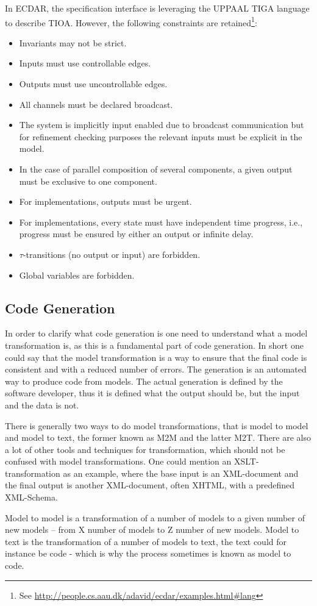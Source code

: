 In ECDAR, the specification interface is leveraging the UPPAAL TIGA language
\cite{behrmann_uppaal-tiga:_2006} to describe TIOA. However, the following
constraints are retained\footnote{See
  \url{http://people.cs.aau.dk/adavid/ecdar/examples.html\#lang}}:
%
\begin{itemize}
\item Invariants may not be strict.
\item Inputs must use controllable edges.
\item Outputs must use uncontrollable edges.
\item All channels must be declared broadcast.
\item The system is implicitly input enabled due to broadcast communication but
  for refinement checking purposes the relevant inputs must be explicit in the
  model.
\item In the case of parallel composition of several components, a given output
  must be exclusive to one component.
\item For implementations, outputs must be urgent.
\item For implementations, every state must have independent time progress,
  i.e., progress must be ensured by either an output or infinite delay.
\item $\tau$-transitions (no output or input) are forbidden.
\item Global variables are forbidden.
\end{itemize}

\subsection{Code Generation}
\label{background-codegeneration}
In order to clarify what code generation is one need to understand what a model
transformation is, as this is a fundamental part of code generation. In short
one could say that the model transformation is a way to ensure that the final
code is consistent and with a reduced number of errors. The generation is an
automated way to produce code from models. The actual generation is defined by
the software developer, thus it is defined what the output should be, but the
input and the data is not.

There is generally two ways to do model transformations, that is model to model
and model to text, the former known as M2M and the latter M2T. There are also a
lot of other tools and techniques for transformation, which should not be
confused with model transformations. One could mention an XSLT-transformation as
an example, where the base input is an XML-document and the final output is
another XML-document, often XHTML, with a predefined XML-Schema.

Model to model is a transformation of a number of models to a given number of
new models -- from X number of models to Z number of new models. Model to text is
the transformation of a number of models to text, the text could for instance be
code - which is why the process sometimes is known as model to code.



